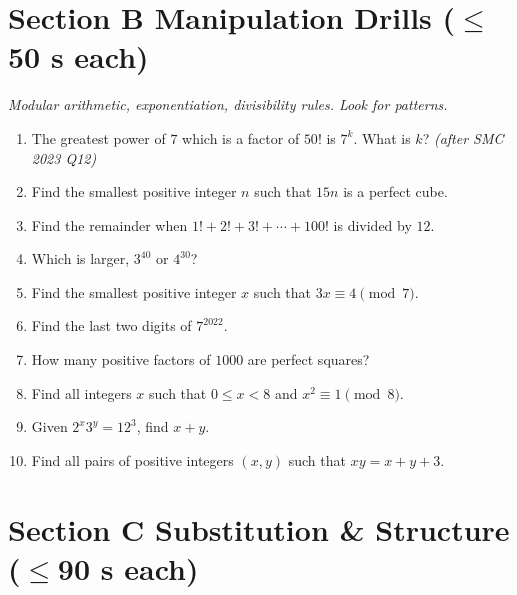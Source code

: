 \documentclass[11pt,a4paper]{article}
\begin{document}
\section*{Section B \quad Manipulation Drills \hfill{\normalfont\small($\leq$50 s each)}}

\noindent\textit{Modular arithmetic, exponentiation, divisibility rules. Look for patterns.}

\begin{enumerate}

\item The greatest power of $7$ which is a factor of $50!$ is $7^k$. What is $k$? \textit{\small(after SMC 2023 Q12)}

\item Find the smallest positive integer $n$ such that $15n$ is a perfect cube.

\item Find the remainder when $1! + 2! + 3! + \cdots + 100!$ is divided by $12$.

\item Which is larger, $3^{40}$ or $4^{30}$?

\item Find the smallest positive integer $x$ such that $3x \equiv 4 \pmod 7$.

\item Find the last two digits of $7^{2022}$.

\item How many positive factors of $1000$ are perfect squares?

\item Find all integers $x$ such that $0 \le x < 8$ and $x^2 \equiv 1 \pmod 8$.

\item Given $2^x 3^y = 12^3$, find $x+y$.

\item Find all pairs of positive integers $(x,y)$ such that $xy = x + y + 3$.

\end{enumerate}

\section*{Section C \quad Substitution \& Structure \hfill{\normalfont\small($\leq$90 s each)}}
\end{document}
